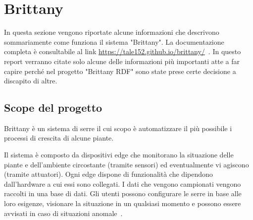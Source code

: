 \section{Brittany}
In questa sezione vengono riportate alcune informazioni che descrivono sommariamente come funziona il sistema "Brittany". La documentazione completa è consultabile al link \url{https://tale152.github.io/brittany/}~\cite{Brittany65:online}.\newline
In questo report verranno citate solo alcune delle informazioni più importanti atte a far capire perché nel progetto "Brittany RDF" sono state prese certe decisione a discapito di altre.

\subsection{Scope del progetto}
Brittany è un sistema di serre il cui scopo è automatizzare il più possibile i processi di crescita di alcune piante.

\noindent Il sistema è composto da dispositivi edge che monitorano la situazione delle piante e dell'ambiente circostante (tramite sensori) ed eventualmente vi agiscono (tramite attuatori). Ogni edge dispone di funzionalità che dipendono dall'hardware a cui essi sono collegati.
I dati che vengono campionati vengono raccolti in una base di dati. Gli utenti possono configurare le serre in base alle loro esigenze, visionare la situazione in un qualsiasi momento e possono essere avvisati in caso di situazioni anomale~\cite{Brittany65:online}.

